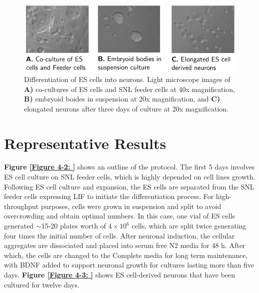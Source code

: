 \begin{figure}[h]
\centering
\includegraphics[scale=1.22]{figures/neuron-differentiation2.pdf}
\caption{Differentiation of ES cells into neurons. Light microscope images of \textbf{A)} co-cultures of ES cells and SNL feeder cells at 40x magnification, \textbf{B)} embryoid boides in suspension at 20x magnification, and \textbf{C)} elongated neurons after three days of culture at 20x magnification.}
\label{Figure 4-1: }
\end{figure}

\section{Representative Results}

\textbf{Figure \ref{Figure 4-2: }} shows an outline of the protocol. The first 5 days involves ES cell culture on SNL feeder cells, which is highly depended on cell lines growth. Following ES cell culture and expansion, the ES cells are separated from the SNL feeder cells expressing LIF to initiate the differentiation process. For high-throughput purposes, cells were grown in suspension and split to avoid overcrowding and obtain optimal numbers. In this case, one vial of ES cells generated $\sim$15-20 plates worth of \(4 \times 10^6 \) cells, which are split twice generating four times the initial number of cells. After neuronal induction, the cellular aggregates are dissociated and placed into serum free N2 media for 48 h. After which, the cells are changed to the Complete media for long term maintenance, with BDNF added to support neuronal growth for cultures lasting more than five days. \textbf{Figure \ref{Figure 4-3: }} shows ES cell-derived neurons that have been cultured for twelve days.

